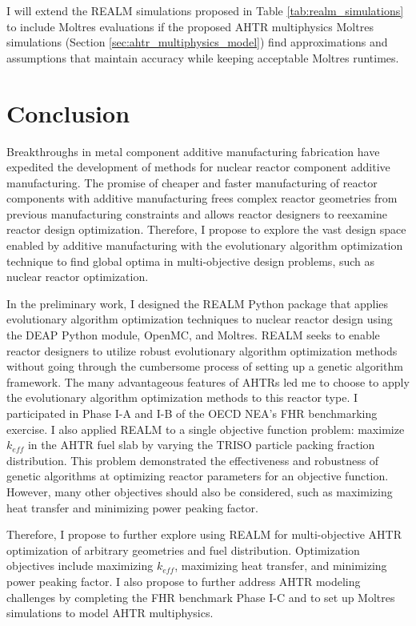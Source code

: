 I will extend the REALM simulations proposed in Table \ref{tab:realm_simulations} 
to include Moltres evaluations if the proposed \gls{AHTR} multiphysics
Moltres simulations (Section \ref{sec:ahtr_multiphysics_model}) find approximations 
and assumptions that maintain accuracy while keeping acceptable Moltres runtimes.

\section{Conclusion}
Breakthroughs in metal component additive manufacturing fabrication have 
expedited the development of methods for nuclear reactor component additive 
manufacturing.
The promise of cheaper and faster manufacturing of reactor components with 
additive manufacturing frees complex reactor geometries from previous manufacturing 
constraints and allows reactor designers to reexamine reactor design optimization. 
Therefore, I propose to explore the vast design space enabled by 
additive manufacturing with the evolutionary algorithm optimization technique 
to find global optima in multi-objective design problems, such as nuclear 
reactor optimization. 

In the preliminary work, I designed the \gls{REALM} Python package that applies 
evolutionary algorithm optimization techniques to nuclear reactor design using 
the \gls{DEAP} Python module, OpenMC, and Moltres.
\gls{REALM} seeks to enable reactor designers to utilize 
robust evolutionary algorithm optimization methods without going 
through the cumbersome process of setting up a genetic algorithm framework.
The many advantageous features of \glspl{AHTR} led me to choose to apply the 
evolutionary algorithm optimization methods to this reactor type.
I participated in Phase I-A and I-B of the \acrfull{OECD} \gls{NEA}'s \gls{FHR} 
benchmarking exercise. 
I also applied \gls{REALM} to a single objective function problem: maximize 
$k_{eff}$ in the \gls{AHTR} fuel slab by varying the \gls{TRISO} particle 
packing fraction distribution. 
This problem demonstrated the effectiveness and robustness of genetic algorithms 
at optimizing reactor parameters for an objective function. 
However, many other objectives should also be considered, such as maximizing heat 
transfer and minimizing power peaking factor.

Therefore, I propose to further explore using \gls{REALM} for multi-objective 
\gls{AHTR} optimization of arbitrary geometries and fuel distribution.
Optimization objectives include maximizing $k_{eff}$, maximizing heat transfer, 
and minimizing power peaking factor. 
I also propose to further address \gls{AHTR} modeling challenges by completing 
the \gls{FHR} benchmark Phase I-C and to set up Moltres simulations to model 
\gls{AHTR} multiphysics.